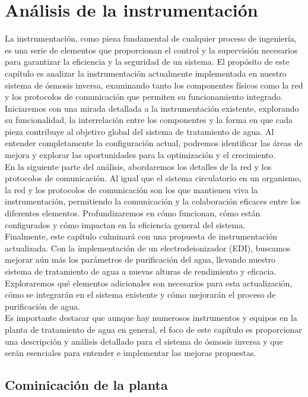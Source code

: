 \chapter{Análisis de la instrumentación}

La instrumentación, como pieza fundamental de cualquier proceso de ingeniería, es una serie de 
elementos que proporcionan el control y la supervisión necesarios para garantizar la eficiencia y la 
seguridad de un sistema. El propósito de este capítulo es analizar la instrumentación actualmente 
implementada en nuestro sistema de ósmosis inversa, examinando tanto los componentes físicos 
como la red y los protocolos de comunicación que permiten su funcionamiento integrado.\\

Iniciaremos con una mirada detallada a la instrumentación existente, explorando su funcionalidad, 
la interrelación entre los componentes y la forma en que cada pieza contribuye al objetivo global del 
sistema de tratamiento de agua. Al entender completamente la configuración actual, podremos identificar 
las áreas de mejora y explorar las oportunidades para la optimización y el crecimiento.\\

En la siguiente parte del análisis, abordaremos los detalles de la red y los protocolos de 
comunicación. Al igual que el sistema circulatorio en un organismo, la red y los protocolos de 
comunicación son los que mantienen viva la instrumentación, permitiendo la comunicación y la colaboración 
eficaces entre los diferentes elementos. Profundizaremos en cómo funcionan, cómo están configurados y 
cómo impactan en la eficiencia general del sistema.\\

Finalmente, este capítulo culminará con una propuesta de instrumentación actualizada. Con la 
implementación de un electrodeionizador (EDI), buscamos mejorar aún más los parámetros de purificación del agua, 
llevando nuestro sistema de tratamiento de agua a nuevas alturas de rendimiento y eficacia. Exploraremos qué 
elementos adicionales son necesarios para esta actualización, cómo se integrarán en el sistema existente y cómo
mejorarán el proceso de purificación de agua.\\

Es importante destacar que aunque hay numerosos instrumentos y equipos en la planta de tratamiento de agua en general, 
el foco de este capítulo es proporcionar una descripción y análisis detallado  para el sistema 
de ósmosis inversa y que serán esenciales para entender e implementar las mejoras propuestas.\\




\section{Cominicación de la planta}


